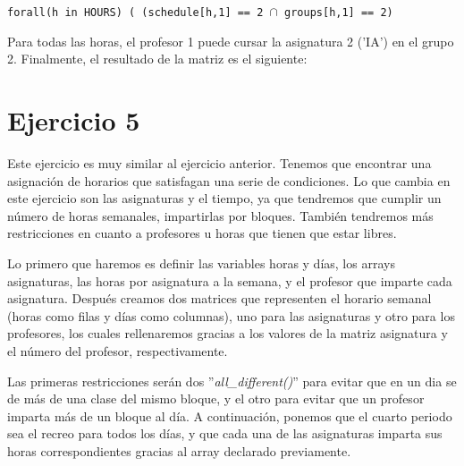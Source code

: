 \documentclass[11pt,a4paper]{article}
\begin{document}
\texttt{forall(h in HOURS) ( (schedule[h,1] == 2 $\cap$ groups[h,1] == 2)}

Para todas las horas, el profesor 1 puede cursar la asignatura 2 ('IA') en el grupo 2. Finalmente, el resultado de la matriz es el siguiente:
\begin{table}[h]
\centering
{}
\end{table}



\section*{Ejercicio 5}
Este ejercicio es muy similar al ejercicio anterior. Tenemos que encontrar una asignación de horarios que satisfagan una serie de condiciones.
Lo que cambia en este ejercicio son las asignaturas y el tiempo, ya que tendremos que cumplir un número de horas semanales, impartirlas
por bloques. También tendremos más restricciones en cuanto a profesores u horas que tienen que estar libres.

Lo primero que haremos es definir las variables horas y días, los arrays asignaturas, las horas por asignatura a la semana, y el profesor que
imparte cada asignatura. Después creamos dos matrices que representen el horario semanal (horas como filas y días como columnas), uno para las
asignaturas y otro para los profesores, los cuales rellenaremos gracias a los valores de la matriz asignatura y el número del profesor,
respectivamente.

Las primeras restricciones serán dos ''\textit{all\_different()}'' para evitar que en un dia se de más de una clase del mismo bloque, y el otro
para evitar que un profesor imparta más de un bloque al día. A continuación, ponemos que el cuarto periodo sea el recreo para todos los días, y
que cada una de las asignaturas imparta sus horas correspondientes gracias al array declarado previamente.
\end{document}
